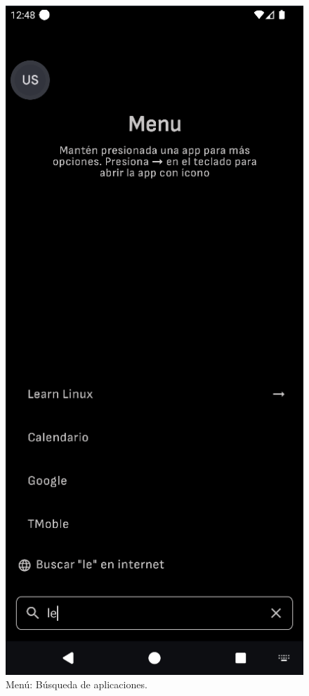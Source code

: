 \begin{figure}[ht!]
\begin{minipage}{0.43\textwidth}
  \end{minipage}\hspace{0.05\textwidth}
  \begin{minipage}{0.43\textwidth}
    \caption{Menú: Búsqueda de aplicaciones.}
    \label{fig:menu_busqueda_aplicaciones}
    \includegraphics[width=\textwidth]{Figuras/secciones/menu_busqueda_aplicaciones.png}
    \centering
  \end{minipage}
\end{figure}

